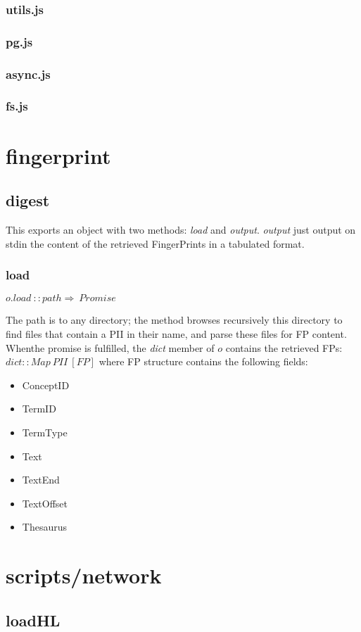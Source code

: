 \documentclass[a4paper,11pt]{report}
\begin{document}
\subsubsection{utils.js}
\subsubsection{pg.js}
\subsubsection{async.js}
\subsubsection{fs.js}
\section{fingerprint}
\subsection{digest}
This exports an object with two methods: \emph{load} and \emph{output}. \emph{output} just output on stdin the content of the retrieved FingerPrints in a tabulated format.
\subsubsection{load}
$o.load\ ::path\Rightarrow\ Promise$

The path is to any directory; the method browses recursively this directory to find files that contain a PII in their name, and parse these files for FP content. Whenthe promise is fulfilled, the \emph{dict} member of $o$ contains the retrieved FPs:
$dict::Map\ PII\ [FP]$
where FP structure contains the following fields:
\begin{itemize}
\item ConceptID
\item TermID
\item TermType
\item Text
\item TextEnd
\item TextOffset
\item Thesaurus
\end{itemize}


\section{scripts/network}
\subsection{loadHL}
\end{document}

